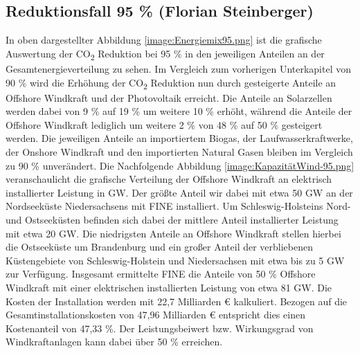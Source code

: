 \newpage
\subsection{Reduktionsfall 95 \% (Florian Steinberger)}


In oben dargestellter Abbildung \ref{image:Energiemix95.png} ist die grafische Auswertung der CO\textsubscript{2} Reduktion bei 95 \% in den jeweiligen Anteilen an der Gesamtenergieverteilung zu sehen. Im Vergleich zum vorherigen Unterkapitel von 90 \% wird die Erhöhung der CO\textsubscript{2} Reduktion nun durch gesteigerte Anteile an Offshore Windkraft und der Photovoltaik erreicht. Die Anteile an Solarzellen werden dabei von 9 \% auf 19 \% um weitere 10 \% erhöht, während die Anteile der Offshore Windkraft lediglich um weitere 2 \% von 48 \% auf 50 \% gesteigert werden. Die jeweiligen Anteile an importiertem Biogas, der Laufwasserkraftwerke, der Onshore Windkraft und den importierten Natural Gasen bleiben im Vergleich zu 90 \% unverändert. Die Nachfolgende Abbildung \ref{image:KapazitätWind-95.png} veranschaulicht die grafische Verteilung der Offshore Windkraft an elektrisch installierter Leistung in GW. Der größte Anteil wir dabei mit etwa 50 GW an der Nordseeküste Niedersachsens mit FINE installiert. Um Schleswig-Holsteins Nord- und Ostseeküsten befinden sich dabei der mittlere Anteil installierter Leistung mit etwa 20 GW. Die niedrigsten Anteile an Offshore Windkraft stellen hierbei die Ostseeküste um Brandenburg und ein großer Anteil der verbliebenen Küstengebiete von Schleswig-Holstein und Niedersachsen mit etwa bis zu 5 GW zur Verfügung. Insgesamt ermittelte FINE die Anteile von 50 \% Offshore Windkraft mit einer elektrischen installierten Leistung von etwa 81 GW. Die Kosten der Installation werden mit 22,7 Milliarden € kalkuliert. Bezogen auf die Gesamtinstallationskosten von 47,96 Milliarden € entspricht dies einen Kostenanteil von 47,33 \%. Der Leistungsbeiwert bzw. Wirkungsgrad von Windkraftanlagen kann dabei über 50 \% erreichen. \cite{ag_2021} 


